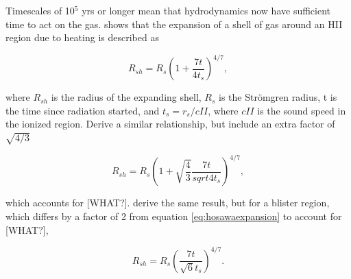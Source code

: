 Timescales of 10$^5$ yrs or longer mean that hydrodynamics now have sufficient time to act on the gas. \citet{spitzer78} shows that the expansion of a shell of gas around an HII region due to heating is described as

\begin{equation}
\label{eq:spitzerexpansion}
R_{sh} = R_s\left(1 + \frac{7t}{4t_s}\right)^{4/7},
\end{equation}

\noindent
where $R_{sh}$ is the radius of the expanding shell, $R_s$ is the Str\"omgren radius, t is the time since radiation started, and $t_s = r_s/cII$, where $cII$ is the sound speed in the ionized region. \citet{hosawaInutsuka06} Derive a similar relationship, but include an extra factor of $\sqrt{4/3}$

\begin{equation}
\label{eq:hosawaexpansion}
R_{sh} = R_s\left(1 + \sqrt{\frac{4}{3}}\frac{7t}{sqrt{4}t_s}\right)^{4/7},
\end{equation}

\noindent
which accounts for [WHAT?]. \citet{gendelevKrumholz12} derive the same result, but for a blister region, which differs by a factor of 2 from equation \ref{eq:hosawaexpansion} to account for [WHAT?],

\begin{equation}
\label{eq:spitzerexpansion}
R_{sh} = R_s\left(\frac{7t}{\sqrt{6}t_s}\right)^{4/7}.
\end{equation}

